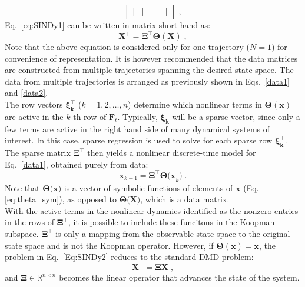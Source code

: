 \begin{itemize}
\begin{equation}
\begin{bmatrix}
        |                &  |               &    \quad&         |       
        \end{bmatrix} \;,
    \end{equation}
    Eq.~\ref{eq:SINDy1} can be written in matrix short-hand as:
    \begin{equation}
    \label{Eq:SINDy2}
        \mathbf{X^+} = \mathbf{\Xi^\top \Theta(X)} \;,
    \end{equation}
    Note that the above equation is considered only for one trajectory ($N =1$) for convenience of representation. It is however recommended that the data matrices are constructed from multiple trajectories spanning the desired state space. The data from multiple trajectories is arranged as previously shown in Eqs.~\ref{data1} and \ref{data2}.\\
    The row vectors $\mathbf{\xi_k^\top}$ ($k = 1,2,\dots,n$) determine which nonlinear terms in $\mathbf{\Theta(x)}$ are active in the $k$-th row of $\mathbf{F}_t$. Typically, $\mathbf{\xi_k}$ will be a sparse vector, since only a few terms are active in the right hand side of many dynamical systems of interest. In this case, sparse regression is used to solve for each sparse row $\mathbf{\xi_k^\top}$. The sparse matrix $\mathbf{\Xi^\top}$ then yields a nonlinear discrete-time model for Eq.~\ref{data1}, obtained purely from data:
    \begin{equation}
        \mathbf{x}_{k+1} = \mathbf{\Xi^\top}\mathbf{\Theta(x}_k) \;.
    \end{equation}
    Note that $\mathbf{\Theta(x})$ is a vector of symbolic functions of elements of $\mathbf{x}$ (Eq. \ref{eq:theta_sym}), as opposed to $\mathbf{\Theta(X})$, which is a data matrix.\\
    With the active terms in the nonlinear dynamics identified as the nonzero entries in the rows of $\mathbf{\Xi^\top}$, it is possible to include these funcitons in the Koopman subspace. $\mathbf{\Xi^\top}$ is only a mapping from the observable state-space to the original state space and is not the Koopman operator. However, if $\mathbf{\Theta(x)} = \mathbf{x}$, the problem in Eq.~\ref{Eq:SINDy2} reduces to the standard DMD problem:
    \begin{equation}
        \mathbf{X^+} = \mathbf{\Xi X} \;,
    \end{equation}
    and $\mathbf{\Xi} \in \mathbb{R}^{n \times n}$ becomes the linear operator that advances the state of the system.
\end{itemize}

